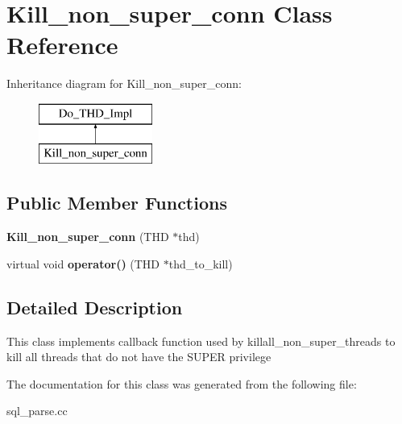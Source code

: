 \hypertarget{classKill__non__super__conn}{}\section{Kill\+\_\+non\+\_\+super\+\_\+conn Class Reference}
\label{classKill__non__super__conn}
Inheritance diagram for Kill\+\_\+non\+\_\+super\+\_\+conn\+:\begin{figure}[H]
\begin{center}
\leavevmode
\includegraphics[height=2.000000cm]{classKill__non__super__conn}
\end{center}
\end{figure}
\subsection*{Public Member Functions}
\begin{DoxyCompactItemize}
\item 
\mbox{\label{classKill__non__super__conn_ad048c9008f0aaf748fdcda0cce4bbc87}} 
{\bfseries Kill\+\_\+non\+\_\+super\+\_\+conn} (T\+HD $\ast$thd)
\item 
\mbox{\label{classKill__non__super__conn_abb31a8cda26a1e642e55b00af88ddccd}} 
virtual void {\bfseries operator()} (T\+HD $\ast$thd\+\_\+to\+\_\+kill)
\end{DoxyCompactItemize}


\subsection{Detailed Description}
This class implements callback function used by killall\+\_\+non\+\_\+super\+\_\+threads to kill all threads that do not have the S\+U\+P\+ER privilege 

The documentation for this class was generated from the following file\+:\begin{DoxyCompactItemize}
\item 
sql\+\_\+parse.\+cc\end{DoxyCompactItemize}
